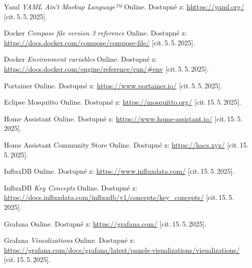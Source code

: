 \begin{thebibliography}{99}
		Yaml \emph{YAML Ain't Markup Language™}\/ Online. 
		Dostupné z:
	\url{hhttps://yaml.org/}
		[cit.\,5.\,5.\,2025].

		Docker \emph{Compose file version 3 reference}\/ Online. 
		Dostupné z:
	\url{https://docs.docker.com/compose/compose-file/}
		[cit.\,5.\,5.\,2025].

		Docker \emph{Environment variables}\/ Online. 
		Dostupné z:
	\url{https://docs.docker.com/engine/reference/run/#env}
		[cit.\,5.\,5.\,2025].

		Portainer\/ Online. 
		Dostupné z:
	\url{https://www.portainer.io/}
		[cit.\,5.\,5.\,2025].

		Eclipse Mosquitto\/ Online. 
		Dostupné z:
	\url{https://mosquitto.org/}
		[cit.\,15.\,5.\,2025].

		Home Assistant\/ Online. 
		Dostupné z:
	\url{https://www.home-assistant.io/}
		[cit.\,15.\,5.\,2025].

		Home Assistant Community Store\/ Online. 
		Dostupné z:
	\url{https://hacs.xyz/}
		[cit.\,15.\,5.\,2025].

		InfluxDB\/ Online. 
		Dostupné z:
	\url{https://www.influxdata.com/}
		[cit.\,15.\,5.\,2025].

		InfluxDB \emph{Key Concepts}\/ Online. 
		Dostupné z:
	\url{https://docs.influxdata.com/influxdb/v1/concepts/key_concepts/}
		[cit.\,15.\,5.\,2025].

		Grafana\/ Online. 
		Dostupné z:
	\url{https://grafana.com/}
		[cit.\,15.\,5.\,2025].

		Grafana \emph{Visualizations}\/ Online. 
		Dostupné z:
	\url{https://grafana.com/docs/grafana/latest/panels-visualizations/visualizations/}
		[cit.\,15.\,5.\,2025].
\end{thebibliography} 
%
%
%
